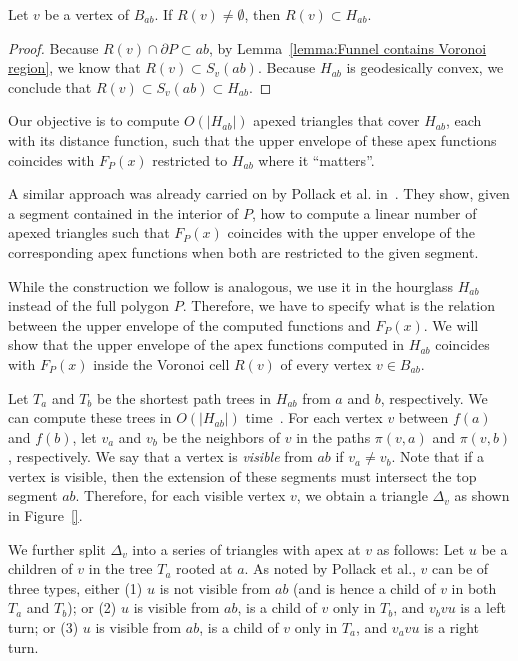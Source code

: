 \documentclass[a4paper,UKenglish]{lipics}
\newcommand{\F}[2]{\ensuremath{F_{\scriptscriptstyle #1}(#2)}}
\newcommand{\fn}[2]{\ensuremath{S_{\scriptscriptstyle #1}(#2)}}
\newcommand{\ff}[1]{\ensuremath{f(#1)}}
\newcommand{\p}[2]{\ensuremath{\pi(#1, #2)}}
\begin{document}
\begin{lemma}\label{lemma:Cell contained in geodesic triangle}
Let $v$ be a vertex of $B_{ab}$. If $R(v)\neq \emptyset$, then $R(v) \subset H_{ab}$.
\end{lemma}
\begin{proof}
Because $R(v)\cap \partial P \subset ab$, by Lemma~\ref{lemma:Funnel contains Voronoi region}, we know that $R(v)\subset \fn{v}{ab}$. Because $H_{ab}$ is geodesically convex, we conclude that $R(v)\subset \fn{v}{ab}\subset H_{ab}$.
\end{proof}


Our objective is to compute $O(|H_{ab}|)$ apexed triangles that cover $H_{ab}$, each with its distance function, such that the upper envelope of these apex functions coincides with $\F{P}{x}$ restricted to $H_{ab}$ where it ``matters''.

A similar approach was already carried on by Pollack et al. in~\cite[Section 3]{pollackComputingCenter}. 
They show, given a segment contained in the interior of $P$, how to compute a linear number of apexed triangles such that $\F{P}{x}$ coincides with the upper envelope of the corresponding apex functions when both are restricted to the given segment.

While the construction we follow is analogous, we use it in the hourglass $H_{ab}$ instead of the full polygon $P$. 
Therefore, we have to specify what is the relation between the upper envelope of the computed functions and $\F{P}{x}$. 
We will show that the upper envelope of the apex functions computed in $H_{ab}$ coincides with $\F{P}{x}$ inside the Voronoi cell $R(v)$ of every vertex $v\in B_{ab}$.

Let $T_a$ and $T_b$ be the shortest path trees in $H_{ab}$ from $a$ and $b$, respectively. We can compute these trees in $O(|H_{ab}|)$ time~\cite{guibasShortestPathTree}. 
For each vertex $v$ between $\ff{a}$ and $\ff{b}$, let $v_a$ and $v_b$ be the neighbors of $v$ in the paths $\p{v}{a}$ and $\p{v}{ b}$, respectively.
We say that a vertex is \emph{visible} from $ab$ if $v_a\neq v_b$.
Note that if a vertex is visible, then the extension of these segments must intersect the top segment $ab$. 
Therefore, for each visible vertex $v$, we obtain a triangle $\Delta_v$ as shown in Figure~\ref{}.

We further split $\Delta_v$ into a series of triangles with apex at $v$ as follows: 
Let $u$ be a children of $v$ in the tree $T_a$ rooted at $a$. As noted by Pollack et al., $v$ can be of three types, either (1) $u$ is not visible from $ab$ (and is hence a child of $v$ in both $T_a$ and $T_b$); or (2) $u$ is visible from $ab$, is a child of $v$ only in $T_b$, and $v_b v u$ is a left turn; or (3) $u$ is visible from $ab$, is a child of $v$ only in $T_a$, and $v_a v u$ is a right turn.
\end{document}
